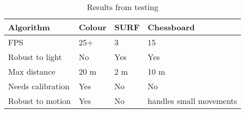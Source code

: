 \begin{table}
	\begin{center}
    	\begin{tabular}{ | l | l | l | p{2.5cm} |}
    	\hline
    	Algorithm & Colour & SURF & Chessboard \\ \hline
		FPS & 25+ & 3 & 15 \\ \hline
		Robust to light & No & Yes & Yes \\ \hline
		Max distance & 20 m & 2 m & 10 m \\ \hline
		Needs calibration & Yes & No & No \\ \hline
		Robust to motion & Yes & No & handles small movements \\ \hline
    	\end{tabular}
	\end{center}
	
	\caption{Results from testing}
	\label{results}

\end{table}
